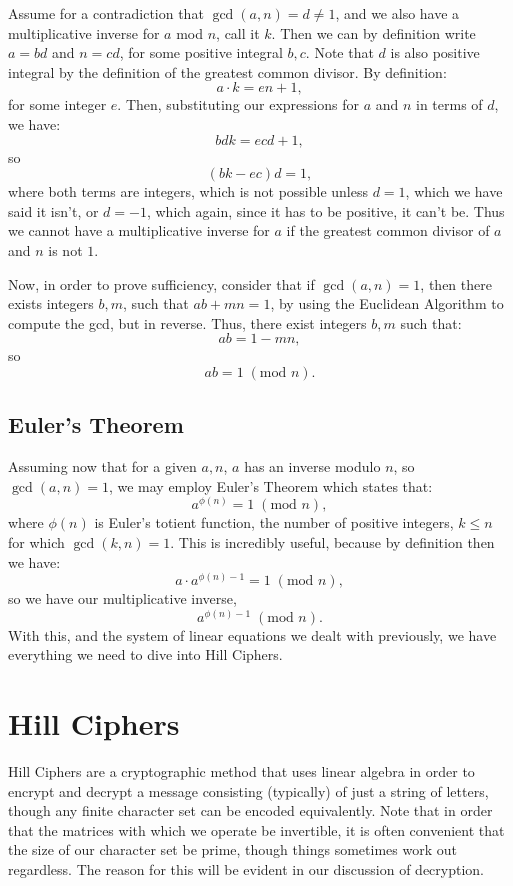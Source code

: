 \documentclass{article}
\begin{document}
\noindent Assume for a contradiction that $\gcd(a, n) = d \neq 1$, and we also have a multiplicative inverse for $a$ mod $n$, call it $k$. Then we can by definition write $a = bd$ and $n = cd$, for some positive integral $b, c$. Note that $d$ is also positive integral by the definition of the greatest common divisor. By definition:
\[
    a \cdot k = en + 1,
\]
for some integer $e$. Then, substituting our expressions for $a$ and $n$ in terms of $d$, we have:
\[
    bdk = ecd + 1,
\]
so
\[
    (bk - ec)d = 1,
\]
where both terms are integers, which is not possible unless $d = 1$, which we have said it isn't, or $d = -1$, which again, since it has to be positive, it can't be. Thus we cannot have a multiplicative inverse for $a$ if the greatest common divisor of $a$ and $n$ is not $1$. \medskip

\noindent Now, in order to prove sufficiency, consider that if $\gcd(a, n) = 1$, then there exists integers $b, m$, such that $ab + mn = 1$, by using the Euclidean Algorithm to compute the gcd, but in reverse. Thus, there exist integers $b, m$ such that:
\[
    ab = 1 - mn,
\]
so
\[
    ab = 1 \; (\text{mod } n).
\]

\subsection{Euler's Theorem}
Assuming now that for a given $a, n$, $a$ has an inverse modulo $n$, so $\gcd(a, n) = 1$, we may employ Euler's Theorem which states that:
\[
    a^{\phi(n)} = 1 \; (\text{mod } n),
\]
where $\phi(n)$ is Euler's totient function, the number of positive integers, $k \leq n$ for which $\gcd(k, n) = 1$. This is incredibly useful, because by definition then we have:
\[
    a \cdot a^{\phi(n) - 1} = 1 \; (\text{mod } n),
\]
so we have our multiplicative inverse,
\[
    a^{\phi(n) - 1} \; (\text{mod } n).
\]
With this, and the system of linear equations we dealt with previously, we have everything we need to dive into Hill Ciphers.

\section{Hill Ciphers}
Hill Ciphers are a cryptographic method that uses linear algebra in order to encrypt and decrypt a message consisting (typically) of just a string of letters, though any finite character set can be encoded equivalently. Note that in order that the matrices with which we operate be invertible, it is often convenient that the size of our character set be prime, though things sometimes work out regardless. The reason for this will be evident in our discussion of decryption.
\end{document}
